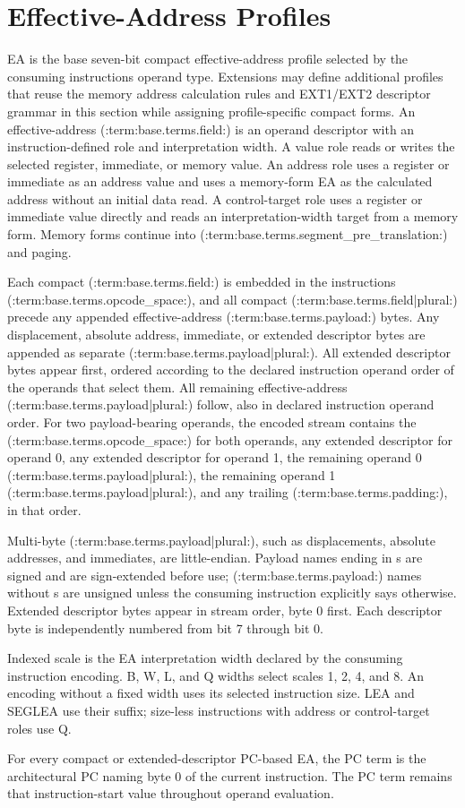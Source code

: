 \clearpage
\section{Effective-Address Profiles}\label{page:effective-addressing-modes}

EA is the base seven-bit compact effective-address profile selected by the consuming instruction\textquotesingle{}s operand
type. Extensions may define additional profiles that reuse the memory address calculation rules and EXT1/EXT2
descriptor grammar in this section while assigning profile-specific compact forms. An effective-address (:term:base.terms.field:) is an operand
descriptor with an instruction-defined role and interpretation width. A
value role reads or writes the selected register, immediate, or memory value. An address role uses a register or
immediate as an address value and uses a memory-form EA as the calculated address without an initial data read. A
control-target role uses a register or immediate value directly and reads an interpretation-width target from a
memory form. Memory forms continue into (:term:base.terms.segment_pre_translation:) and paging.

Each compact (:term:base.terms.field:) is embedded in the instruction\textquotesingle{}s (:term:base.terms.opcode_space:), and all compact (:term:base.terms.field|plural:) precede any appended
effective-address (:term:base.terms.payload:) bytes. Any displacement, absolute address, immediate, or extended
descriptor bytes are appended as separate (:term:base.terms.payload|plural:). All extended descriptor bytes appear first, ordered according to the
declared instruction operand order of the operands that select them. All remaining effective-address (:term:base.terms.payload|plural:) follow, also in
declared instruction operand order.
For two payload-bearing operands, the encoded stream contains the (:term:base.terms.opcode_space:) for both operands, any extended descriptor for
operand 0, any extended descriptor for operand 1, the remaining operand 0 (:term:base.terms.payload|plural:), the remaining operand 1
(:term:base.terms.payload|plural:), and any trailing (:term:base.terms.padding:), in that order.

Multi-byte (:term:base.terms.payload|plural:), such as displacements, absolute addresses, and immediates, are little-endian. Payload
names ending in s are signed and are sign-extended before use; (:term:base.terms.payload:) names without s are unsigned unless the
consuming instruction explicitly says otherwise. Extended descriptor bytes appear in stream order, byte 0 first. Each
descriptor byte is independently numbered from bit 7 through bit 0.

Indexed scale is the EA interpretation width declared by the consuming instruction encoding. B, W, L, and Q widths select scales 1,
2, 4, and 8. An encoding without a fixed width uses its selected instruction size. LEA and SEGLEA use
their suffix; size-less instructions with address or control-target roles use Q.

For every compact or extended-descriptor PC-based EA, the PC term is the architectural PC naming byte 0 of the current instruction.
The PC term remains that instruction-start value throughout operand evaluation.

\clearpage

